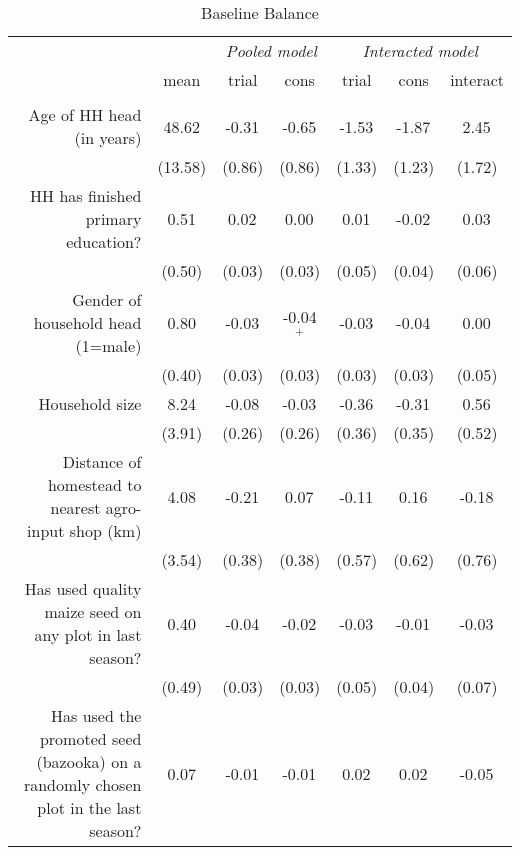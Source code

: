 \documentclass[english]{article}\usepackage[]{graphicx}\usepackage[]{xcolor}
\begin{document}
\begin{sidewaystable}
\caption{Baseline Balance\label{balance_table}}

\footnotesize
\begin{center}
\begin{tabular}{rcccccc}
\hline\hline
& & \multicolumn{2}{c}{\textit{Pooled model}} & \multicolumn{3}{c}{\textit{Interacted model}} \\
& mean & trial & cons & trial & cons & interact \\
\hline
\\
Age of HH head (in years)
& 48.62
& -0.31$^{}$
& -0.65$^{}$ 
& -1.53$^{}$ 
& -1.87$^{}$
& 2.45$^{}$ \\

& (13.58) & (0.86)  & (0.86) & (1.33)  & (1.23)  & (1.72)
 \\
HH has finished primary education?
& 0.51
& 0.02$^{}$
& 0.00$^{}$ 
& 0.01$^{}$ 
& -0.02$^{}$
& 0.03$^{}$ \\

& (0.50) & (0.03)  & (0.03) & (0.05)  & (0.04)  & (0.06)
 \\
Gender of household head (1=male)
& 0.80
& -0.03$^{}$
& -0.04$^{+}$ 
& -0.03$^{}$ 
& -0.04$^{}$
& 0.00$^{}$ \\

& (0.40) & (0.03)  & (0.03) & (0.03)  & (0.03)  & (0.05)
 \\

Household size
& 8.24
& -0.08$^{}$
& -0.03$^{}$ 
& -0.36$^{}$ 
& -0.31$^{}$
& 0.56$^{}$ \\

& (3.91) & (0.26)  & (0.26) & (0.36)  & (0.35)  & (0.52)
 \\

Distance of homestead to nearest agro-input shop (km)
& 4.08
& -0.21$^{}$
& 0.07$^{}$ 
& -0.11$^{}$ 
& 0.16$^{}$
& -0.18$^{}$ \\

& (3.54) & (0.38)  & (0.38) & (0.57)  & (0.62)  & (0.76)
 \\
Has used quality maize seed on any plot in last season?
& 0.40
& -0.04$^{}$
& -0.02$^{}$ 
& -0.03$^{}$ 
& -0.01$^{}$
& -0.03$^{}$ \\

& (0.49) & (0.03)  & (0.03) & (0.05)  & (0.04)  & (0.07)
 \\

Has used the promoted seed (bazooka) on a randomly chosen plot in the last season?
& 0.07
& -0.01$^{}$
& -0.01$^{}$ 
& 0.02$^{}$ 
& 0.02$^{}$
& -0.05$^{}$ \\


\end{tabular}
\end{center}
\end{sidewaystable}
\end{document}
